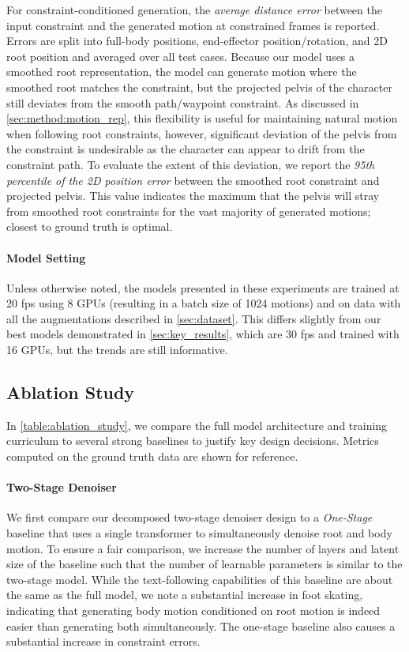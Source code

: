 For constraint-conditioned generation, the \textit{average distance error} between the input constraint and the generated motion at constrained frames is reported. Errors are split into full-body positions, end-effector position/rotation, and 2D root position and averaged over all test cases.
Because our model uses a smoothed root representation, the model can generate motion where the smoothed root matches the constraint, but the projected pelvis of the character still deviates from the smooth path/waypoint constraint. As discussed in \cref{sec:method:motion_rep}, this flexibility is useful for maintaining natural motion when following root constraints, however, significant deviation of the pelvis from the constraint is undesirable as the character can appear to drift from the constraint path. 
To evaluate the extent of this deviation, we report the \textit{95th percentile of the 2D position error} between the smoothed root constraint and projected pelvis. This value indicates the maximum that the pelvis will stray from smoothed root constraints for the vast majority of generated motions; closest to ground truth is optimal.

\paragraph{Model Setting}
Unless otherwise noted, the models presented in these experiments are trained at 20 fps using 8 GPUs (resulting in a batch size of 1024 motions) and on data with all the augmentations described in \cref{sec:dataset}. 
This differs slightly from our best models demonstrated in \cref{sec:key_results}, which are 30 fps and trained with 16 GPUs, but the trends are still informative.



\subsection{Ablation Study}
\label{sec:experiments:ablations}

In \cref{table:ablation_study}, we compare the full model architecture and training curriculum to several strong baselines to justify key design decisions. Metrics computed on the ground truth data are shown for reference.

\paragraph{Two-Stage Denoiser}
We first compare our decomposed two-stage denoiser design to a \textit{One-Stage} baseline that uses a single transformer to simultaneously denoise root and body motion. To ensure a fair comparison, we increase the number of layers and latent size of the baseline such that the number of learnable parameters is similar to the two-stage model. 
While the text-following capabilities of this baseline are about the same as the full model, we note a substantial increase in foot skating, indicating that generating body motion conditioned on root motion is indeed easier than generating both simultaneously. The one-stage baseline also causes a substantial increase in constraint errors.


